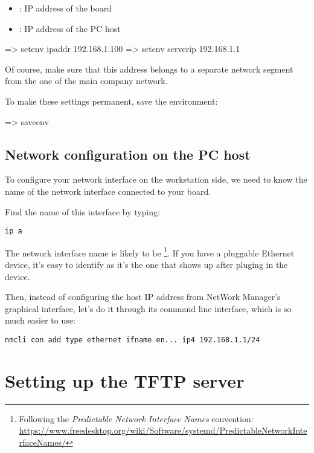 \begin{itemize}
\item {}: IP address of the board
\item {}: IP address of the PC host
\end{itemize}

\begin{ubootinput}
=> setenv ipaddr 192.168.1.100
=> setenv serverip 192.168.1.1
\end{ubootinput}

Of course, make sure that this address belongs to a separate network
segment from the one of the main company network.

To make these settings permanent, save the environment:

\begin{ubootinput}
=> saveenv
\end{ubootinput}

\subsection{Network configuration on the PC host}

To configure your network interface on the workstation side, we need
to know the name of the network interface connected to your board.

Find the name of this interface by typing:

\begin{verbatim}
ip a
\end{verbatim}

The network interface name is likely to be
\footnote{Following the {\em Predictable Network Interface
Names} convention:
\url{https://www.freedesktop.org/wiki/Software/systemd/PredictableNetworkInterfaceNames/}}.
If you have a pluggable Ethernet device, it's easy to identify as it's
the one that shows up after pluging in the device.

Then, instead of configuring the host IP address from NetWork Manager's
graphical interface, let's do it through its command line interface,
which is so much easier to use:

\begin{verbatim}
nmcli con add type ethernet ifname en... ip4 192.168.1.1/24
\end{verbatim}

\section{Setting up the TFTP server}

